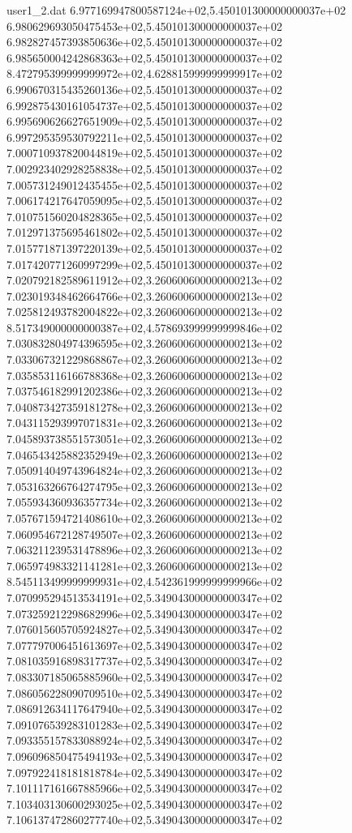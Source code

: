 \begin{filecontents}{user1_2.dat}
6.977169947800587124e+02,5.450101300000000037e+02
6.980629693050475453e+02,5.450101300000000037e+02
6.982827457393850636e+02,5.450101300000000037e+02
6.985650004242868363e+02,5.450101300000000037e+02
8.472795399999999972e+02,4.628815999999999917e+02
6.990670315435260136e+02,5.450101300000000037e+02
6.992875430161054737e+02,5.450101300000000037e+02
6.995690626627651909e+02,5.450101300000000037e+02
6.997295359530792211e+02,5.450101300000000037e+02
7.000710937820044819e+02,5.450101300000000037e+02
7.002923402928258838e+02,5.450101300000000037e+02
7.005731249012435455e+02,5.450101300000000037e+02
7.006174217647059095e+02,5.450101300000000037e+02
7.010751560204828365e+02,5.450101300000000037e+02
7.012971375695461802e+02,5.450101300000000037e+02
7.015771871397220139e+02,5.450101300000000037e+02
7.017420771260997299e+02,5.450101300000000037e+02
7.020792182589611912e+02,3.260600600000000213e+02
7.023019348462664766e+02,3.260600600000000213e+02
7.025812493782004822e+02,3.260600600000000213e+02
8.517349000000000387e+02,4.578693999999999846e+02
7.030832804974396595e+02,3.260600600000000213e+02
7.033067321229868867e+02,3.260600600000000213e+02
7.035853116166788368e+02,3.260600600000000213e+02
7.037546182991202386e+02,3.260600600000000213e+02
7.040873427359181278e+02,3.260600600000000213e+02
7.043115293997071831e+02,3.260600600000000213e+02
7.045893738551573051e+02,3.260600600000000213e+02
7.046543425882352949e+02,3.260600600000000213e+02
7.050914049743964824e+02,3.260600600000000213e+02
7.053163266764274795e+02,3.260600600000000213e+02
7.055934360936357734e+02,3.260600600000000213e+02
7.057671594721408610e+02,3.260600600000000213e+02
7.060954672128749507e+02,3.260600600000000213e+02
7.063211239531478896e+02,3.260600600000000213e+02
7.065974983321141281e+02,3.260600600000000213e+02
8.545113499999999931e+02,4.542361999999999966e+02
7.070995294513534191e+02,5.349043000000000347e+02
7.073259212298682996e+02,5.349043000000000347e+02
7.076015605705924827e+02,5.349043000000000347e+02
7.077797006451613697e+02,5.349043000000000347e+02
7.081035916898317737e+02,5.349043000000000347e+02
7.083307185065885960e+02,5.349043000000000347e+02
7.086056228090709510e+02,5.349043000000000347e+02
7.086912634117647940e+02,5.349043000000000347e+02
7.091076539283101283e+02,5.349043000000000347e+02
7.093355157833088924e+02,5.349043000000000347e+02
7.096096850475494193e+02,5.349043000000000347e+02
7.097922418181818784e+02,5.349043000000000347e+02
7.101117161667885966e+02,5.349043000000000347e+02
7.103403130600293025e+02,5.349043000000000347e+02
7.106137472860277740e+02,5.349043000000000347e+02

\end{filecontents}

